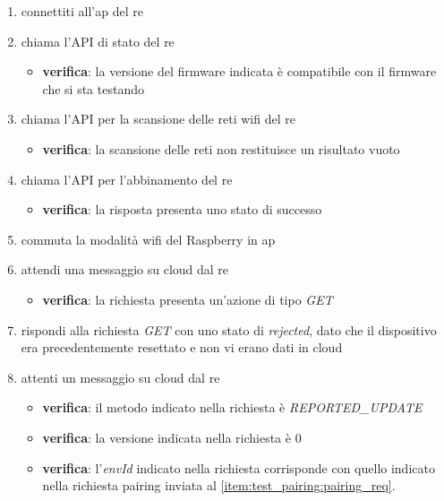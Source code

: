 \documentclass[12pt,a4paper,twoside,titlepage]{book}
\begin{document}
\begin{enumerate}
    \item connettiti all'\acrshort{ap} del \acrshort{re}
    \item chiama l'API di stato del \acrshort{re}
    \begin{itemize}
        \item \textbf{verifica}: la versione del \gls{firmware} indicata è compatibile con il \gls{firmware} 
            che si sta testando 
    \end{itemize}
    \item chiama l'API per la scansione delle reti \Gls{wifi} del \acrshort{re}
    \begin{itemize}
        \item \textbf{verifica}: la scansione delle reti non restituisce un risultato vuoto 
    \end{itemize}
    \item chiama l'API per l'abbinamento del \acrshort{re} \label{item:test_pairing:pairing_req}
    \begin{itemize}
        \item \textbf{verifica}: la risposta presenta uno stato di successo 
    \end{itemize}
    \item commuta la modalità \Gls{wifi} del Raspberry in \acrshort{ap}
    \item attendi una messaggio su cloud dal \acrshort{re}
    \begin{itemize}
        \item \textbf{verifica}: la richiesta presenta un'azione di tipo \textit{GET}
    \end{itemize}
    \item rispondi alla richiesta \textit{GET} con uno stato di \textit{rejected}, dato che 
        il dispositivo era precedentemente resettato e non vi erano dati in cloud
    \item attenti un messaggio su cloud dal \acrshort{re}
    \begin{itemize}
        \item \textbf{verifica}: il metodo indicato nella richiesta è \textit{REPORTED\_UPDATE}
        \item \textbf{verifica}: la versione indicata nella richiesta è 0
        \item \textbf{verifica}: l'\textit{envId} indicato nella richiesta corrisponde con quello 
            indicato nella richiesta pairing inviata al \autoref{item:test_pairing:pairing_req}.
    \end{itemize}
\end{enumerate}
\end{document}
